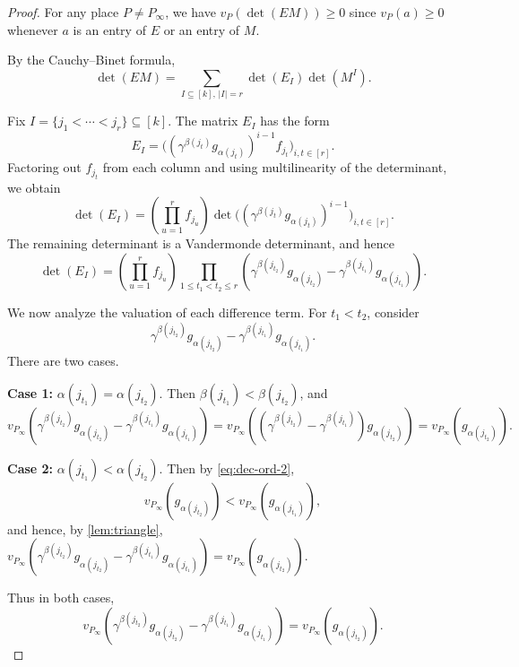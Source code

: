 \documentclass[10pt,a4paper]{amsart}
\begin{document}
\begin{proof}
For any place $P\neq P_\infty$, we have $v_P(\det(EM))\geq 0$ since $v_P(a)\geq 0$ whenever $a$ is an entry of $E$ or an entry of $M$.

By the Cauchy--Binet formula,
\[
\det(EM)=\sum_{I\subseteq [k],\, |I|=r}\det(E_I)\det(M^I).
\]

Fix $I=\{j_1<\cdots<j_r\}\subseteq [k]$. The matrix $E_I$ has the form
\[
E_I=\bigl((\gamma^{\beta(j_t)} g_{\alpha(j_t)})^{i-1} f_{j_t}\bigr)_{i,t\in [r]}.
\]
Factoring out $f_{j_t}$ from each column and using multilinearity of the determinant, we obtain
\[
\det(E_I)=\left(\prod_{u=1}^r f_{j_u}\right)
\det\bigl((\gamma^{\beta(j_t)} g_{\alpha(j_t)})^{i-1}\bigr)_{i,t\in [r]}.
\]
The remaining determinant is a Vandermonde determinant, and hence
\begin{equation}\label{eq:expansion-EI}
\det(E_I)=\left(\prod_{u=1}^r f_{j_u}\right)
\prod_{1\le t_1<t_2\le r}
\left(\gamma^{\beta(j_{t_2})} g_{\alpha(j_{t_2})}-\gamma^{\beta(j_{t_1})} g_{\alpha(j_{t_1})}\right).
\end{equation}

\medskip
We now analyze the valuation of each difference term. For $t_1<t_2$, consider
\[
\gamma^{\beta(j_{t_2})} g_{\alpha(j_{t_2})}
-
\gamma^{\beta(j_{t_1})} g_{\alpha(j_{t_1})}.
\]
There are two cases.

\smallskip
\noindent\textbf{Case 1:} $\alpha(j_{t_1})=\alpha(j_{t_2})$.
Then $\beta(j_{t_1})<\beta(j_{t_2})$, and
\[
v_{P_\infty}\!\left(
\gamma^{\beta(j_{t_2})} g_{\alpha(j_{t_2})}
-
\gamma^{\beta(j_{t_1})} g_{\alpha(j_{t_1})}
\right)
=
v_{P_\infty}\!\left(
(\gamma^{\beta(j_{t_2})}-\gamma^{\beta(j_{t_1})}) g_{\alpha(j_{t_2})}
\right)
=
v_{P_\infty}(g_{\alpha(j_{t_2})}).
\]

\smallskip
\noindent\textbf{Case 2:} $\alpha(j_{t_1})<\alpha(j_{t_2})$.
Then by \eqref{eq:dec-ord-2},
\[
v_{P_\infty}(g_{\alpha(j_{t_2})})<v_{P_\infty}(g_{\alpha(j_{t_1})}),
\]
and hence, by \cref{lem:triangle},  $v_{P_\infty}\!\left(
\gamma^{\beta(j_{t_2})} g_{\alpha(j_{t_2})}
-
\gamma^{\beta(j_{t_1})} g_{\alpha(j_{t_1})}
\right)
=
v_{P_\infty}(g_{\alpha(j_{t_2})})$.

\smallskip
Thus in both cases, 
\begin{equation}\label{eq:diff}
v_{P_\infty}\!\left(
\gamma^{\beta(j_{t_2})} g_{\alpha(j_{t_2})}
-
\gamma^{\beta(j_{t_1})} g_{\alpha(j_{t_1})}
\right)
=
v_{P_\infty}(g_{\alpha(j_{t_2})}).
\end{equation}


\end{proof}
\end{document}

